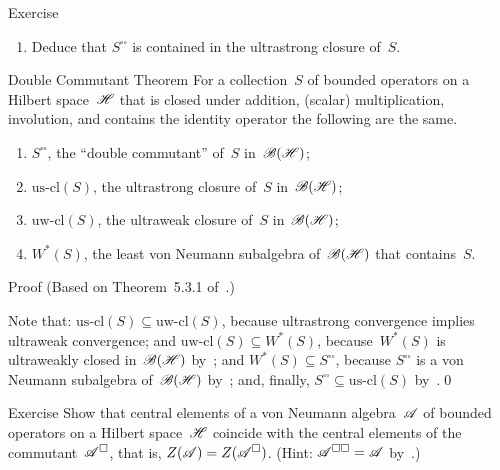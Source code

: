 \documentclass[a]{subfiles}
\begin{document}
\begin{parsec}
\begin{point}{Exercise}
\begin{point}
\begin{enumerate}
\item
Deduce that $S^{\square\square}$
is contained in the ultrastrong closure of~$S$.
\end{enumerate}
\end{point}
\end{point}
\begin{point}{Double Commutant Theorem}%
For a collection~$S$ of bounded operators
on a Hilbert space~$\mathscr{H}$
that is closed under addition, (scalar) multiplication,
involution, and contains the identity operator
the following are the same.
\begin{enumerate}
\item
$S^{\square\square}$, the ``double commutant'' of~$S$
in~$\mathscr{B}(\mathscr{H})$;
\item
$\mathrm{us}\text{-}\mathrm{cl}(S)$,
the ultrastrong closure of~$S$ in~$\mathscr{B}(\mathscr{H})$;
\item
$\mathrm{uw}\text{-}\mathrm{cl}(S)$,
the ultraweak closure of~$S$ in~$\mathscr{B}(\mathscr{H})$;
\item
$W^*(S)$,
the least von Neumann subalgebra of~$\mathscr{B}(\mathscr{H})$
that contains~$S$.
\end{enumerate}
\begin{point}{Proof}%
(Based on Theorem~5.3.1 of~\cite{kr}.) 

Note that: $\mathrm{us}\text{-}\mathrm{cl}(S)
\subseteq  \mathrm{uw}\text{-}\mathrm{cl}(S)$,
because ultrastrong convergence implies ultraweak convergence;
and
$\mathrm{uw}\text{-}\mathrm{cl}(S)
\subseteq W^*(S)$,
because~$W^*(S)$ 
is ultraweakly closed in~$\mathscr{B}(\mathscr{H})$ by~;
and
$W^*(S)\subseteq S^{\square\square}$,
because 
$S^{\square\square}$ is a von Neumann subalgebra
of~$\mathscr{B}(\mathscr{H})$ by~;
and, finally, $S^{\square\square}\subseteq \mathrm{us}\text{-}\mathrm{cl}(S)$
by~.\qed
\end{point}
\end{point}
\begin{point}{Exercise}
Show that central elements of
a von Neumann algebra~$\mathscr{A}$
of bounded operators on a Hilbert space~$\mathscr{H}$
coincide with the central elements of the commutant~$\mathscr{A}^\square$,
that is, $Z(\mathscr{A})=Z(\mathscr{A}^\square)$.
(Hint: $\mathscr{A}^{\square\square}=\mathscr{A}$ by~.)
\end{point}
\end{parsec}
\end{document}
